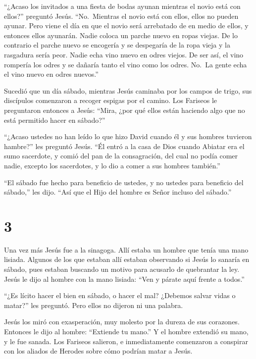  ``¿Acaso los invitados a una fiesta de bodas ayunan
mientras el novio está con ellos?'' preguntó Jesús. ``No.~Mientras el
novio está con ellos, ellos no pueden ayunar.  Pero viene
el día en que el novio será arrebatado de en medio de ellos, y entonces
ellos ayunarán.  Nadie coloca un parche nuevo en ropas
viejas. De lo contrario el parche nuevo se encogería y se despegaría de
la ropa vieja y la rasgadura sería peor.  Nadie echa vino
nuevo en odres viejos. De ser así, el vino rompería los odres y se
dañaría tanto el vino como los odres. No.~La gente echa el vino nuevo en
odres nuevos.''

 Sucedió que un día sábado, mientras Jesús caminaba por los
campos de trigo, sus discípulos comenzaron a recoger espigas por el
camino.  Los Fariseos le preguntaron entonces a Jesús:
``Mira, ¿por qué ellos están haciendo algo que no está permitido hacer
en sábado?''

 ``¿Acaso ustedes no han leído lo que hizo David cuando él
y sus hombres tuvieron hambre?'' les preguntó Jesús.  ``Él
entró a la casa de Dios cuando Abiatar era el sumo sacerdote, y comió
del pan de la consagración, del cual no podía comer nadie, excepto los
sacerdotes, y lo dio a comer a sus hombres también.''

 ``El sábado fue hecho para beneficio de ustedes, y no
ustedes para beneficio del sábado,'' les dijo.  ``Así que
el Hijo del hombre es Señor incluso del sábado.''

\hypertarget{section-2}{%
\section{3}\label{section-2}}

 Una vez más Jesús fue a la sinagoga. Allí estaba un hombre
que tenía una mano lisiada.  Algunos de los que estaban allí
estaban observando si Jesús lo sanaría en sábado, pues estaban buscando
un motivo para acusarlo de quebrantar la ley.  Jesús le dijo
al hombre con la mano lisiada: ``Ven y párate aquí frente a todos.''

 ``¿Es lícito hacer el bien en sábado, o hacer el mal?
¿Debemos salvar vidas o matar?'' les preguntó. Pero ellos no dijeron ni
una palabra.

 Jesús los miró con exasperación, muy molesto por la dureza
de sus corazones. Entonces le dijo al hombre: ``Extiende tu mano.'' Y el
hombre extendió su mano, y le fue sanada.  Los Fariseos
salieron, e inmediatamente comenzaron a conspirar con los aliados de
Herodes sobre cómo podrían matar a Jesús.

